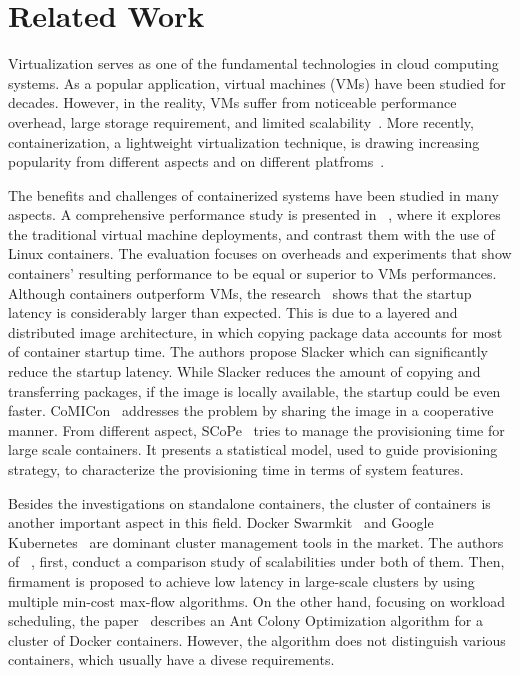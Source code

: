 \section{Related Work}
Virtualization serves as one of the fundamental technologies in cloud computing systems. 
As a popular application, virtual machines (VMs) have been studied for decades.
However, in the reality, VMs suffer from noticeable
performance overhead, large storage requirement, and limited scalability~\cite{xu2014managing}.
More recently, containerization, a lightweight virtualization technique,  
is drawing increasing popularity from different aspects and on different 
platfroms~\cite{secpod, men2012interface, 
cheng2014efficiently, cheng2013qbdj, cheng2016efficient, cheng2014efficient, edos, bhimani2016, bhimani2017,tang2012gpu, du2015gpu, zhao2012mesh}.

The benefits and challenges of containerized systems have been studied in many aspects.
A comprehensive performance study is presented in ~\cite{felter2015updated}, where it explores the traditional
virtual machine deployments, and contrast them with the use
of Linux containers. The evaluation focuses on overheads and experiments 
that show containers' resulting performance to be equal or superior to VMs performances.
Although containers outperform VMs, 
the research~\cite{slacker} shows that the startup latency is considerably larger than expected.
This is due to a layered and distributed image architecture, in which copying package data accounts
for most of container startup time. The authors propose Slacker which can significantly reduce the startup latency.
While Slacker reduces the amount of copying and transferring packages, if the image is locally available, the
startup could be even faster. CoMICon~\cite{nathan2017comicon} addresses the problem by sharing the image in a cooperative manner. From different aspect, SCoPe~\cite{scope} tries to manage the provisioning time for large scale containers. 
It presents a statistical model, used to guide provisioning strategy, to characterize the provisioning time in terms of system features.

Besides the investigations on standalone containers, the cluster of containers is another important aspect in this field.
Docker Swarmkit~\cite{swarmkit} and Google Kubernetes~\cite{bernstein2014containers} are dominant cluster management tools in the market.
The authors of ~\cite{gog2016firmament}, first, conduct a comparison study of scalabilities under both of them. Then, firmament is proposed
to achieve low latency in large-scale clusters by using multiple min-cost max-flow algorithms. 
On the other hand, focusing on workload scheduling, the paper~\cite{kaewkasi2017improvement} describes an Ant Colony Optimization algorithm
for a cluster of Docker containers. However, the algorithm does not distinguish various containers, which usually have a divese requirements.

